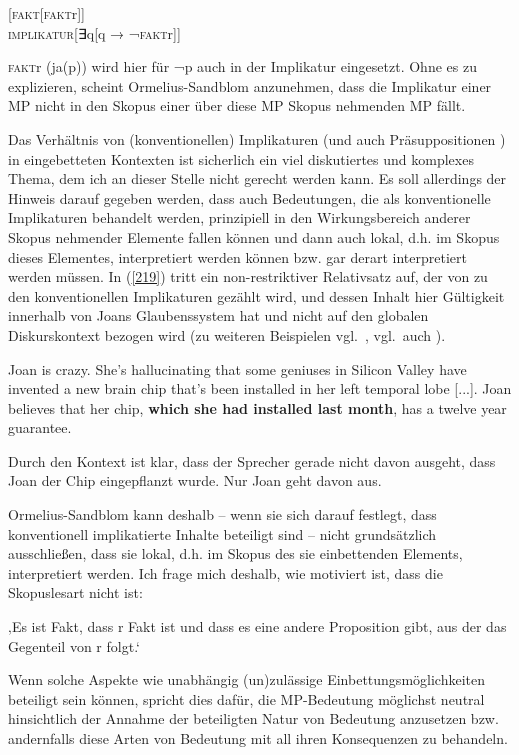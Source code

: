 \begin{exe}
	\ex\label{218}									 
	[\textrm{\textsc{fakt}[\textsc{fakt}r}]]\\
	\textsc{implikatur}[∃\textrm{q}[\textrm{q} → ¬\textrm{\textsc{fakt}r}]]
\end{exe}
\textsc{fakt}r (ja(p)) wird hier für ¬p auch in der Implikatur eingesetzt. Ohne es zu explizieren,  scheint Ormelius-Sandblom anzunehmen, dass die Implikatur einer MP  nicht in den Skopus einer über diese MP Skopus nehmenden MP fällt.

Das Verhältnis von (konventionellen) Implikaturen  (und auch Präsuppositionen ) in eingebetteten Kontexten ist sicherlich ein viel diskutiertes und komplexes Thema, dem ich an dieser Stelle nicht gerecht werden kann. Es soll al\-lerdings der Hinweis darauf gegeben werden, dass auch Bedeutungen, die als konventionelle Implikaturen behandelt werden, prinzipiell in den Wirkungsbereich anderer Skopus nehmender Elemente fallen können und dann auch lokal, d.h. im Skopus dieses Elementes, interpretiert werden können bzw. gar derart interpretiert werden müssen. In (\ref{219}) tritt ein non-restriktiver Relativsatz  auf, der von \citet{Potts2005} zu den konventionellen Implikaturen gezählt wird, und dessen Inhalt hier Gültigkeit innerhalb von Joans Glaubenssystem hat und nicht auf den glo\-balen Diskurskontext bezogen wird (zu weiteren Beispielen vgl.\ \citealt[733--739]{Amaral2007}, vgl.\ auch \citealt{Harris2009}).

\begin{exe}
	\ex\label{219}									 
	Joan is crazy. She's hallucinating that some geniuses in Silicon Valley have invented a new brain chip that's been installed in her left temporal lobe 	[...]. Joan believes that her chip, \textbf{which she had installed last month}, has a twelve year guarantee.
	\hfill\hbox{\citet[735--736]{Amaral2007}}	
\end{exe}
Durch den Kontext ist klar, dass der Sprecher gerade nicht davon ausgeht, dass Joan der Chip eingepflanzt wurde. Nur Joan geht davon aus.

Ormelius-Sandblom kann deshalb – wenn sie sich darauf festlegt, dass konventionell implikatierte Inhalte beteiligt sind – nicht grundsätzlich ausschließen, dass sie lokal, d.h. im Skopus des sie einbettenden Elements, interpretiert werden. Ich frage mich deshalb, wie motiviert ist, dass die Skopuslesart nicht ist: 

\begin{exe}
	\ex\label{220}									 
	‚Es ist Fakt, dass r Fakt ist und dass es eine andere Proposition gibt, aus der das Gegenteil von r folgt.‘
\end{exe}
Wenn solche Aspekte wie unabhängig (un)zulässige Einbettungsmöglichkeiten beteiligt sein können, spricht dies dafür, die MP-Bedeutung möglichst neutral hinsichtlich der Annahme der beteiligten Natur von Bedeutung anzusetzen bzw. andernfalls diese Arten von Bedeutung mit all ihren Konsequenzen zu behandeln.

